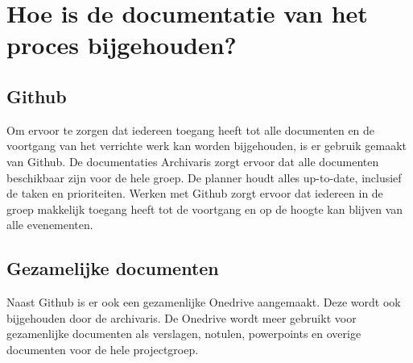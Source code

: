 \section{Hoe is de documentatie van het proces bijgehouden?}
\subsection{Github}
Om ervoor te zorgen dat iedereen toegang heeft tot alle documenten en de voortgang van het verrichte werk kan worden bijgehouden, is er gebruik gemaakt van Github. De documentaties Archivaris zorgt ervoor dat alle documenten beschikbaar zijn voor de hele groep. De planner houdt alles up-to-date, inclusief de taken en prioriteiten. Werken met Github zorgt ervoor dat iedereen in de groep makkelijk toegang heeft tot de voortgang en op de hoogte kan blijven van alle evenementen.
\subsection{Gezamelijke documenten}
Naast Github is er ook een gezamenlijke Onedrive aangemaakt. Deze wordt ook bijgehouden door de archivaris. De Onedrive wordt meer gebruikt voor gezamenlijke documenten als verslagen, notulen, powerpoints en overige documenten voor de hele projectgroep. 